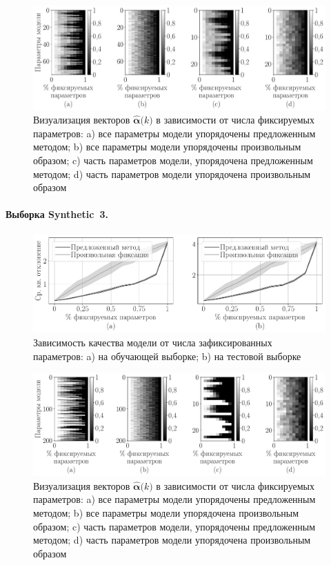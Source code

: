 \begin{figure}[h!t]\center
\includegraphics[width=1\textwidth]{results/order/boston_data_matshow}
\caption{Визуализация векторов $\hat{\bm{\alpha}}\bigr(k\bigr)$ в зависимости от числа фиксируемых параметров: a) все параметры модели упорядочены предложенным методом; b) все параметры модели упорядочены произвольным образом; c) часть параметров модели, упорядочена предложенным методом; d) часть параметров модели упорядочена произвольным образом}
\label{fg:ex:bost:2}
\end{figure}

\paragraph{Выборка Synthetic~3.}
\begin{figure}[h!t]\center
\includegraphics[width=1\textwidth]{results/order/generate_data_linear_loss}
\caption{Зависимость качества модели от числа зафиксированных параметров: a) на обучающей выборке; b) на тестовой выборке}
\label{fg:ex:syn1:1}
\end{figure}

\begin{figure}[h!t]\center
\includegraphics[width=1\textwidth]{results/order/generate_data_linear_matshow}
\caption{Визуализация векторов $\hat{\bm{\alpha}}\bigr(k\bigr)$ в зависимости от числа фиксируемых параметров: a) все параметры модели упорядочены предложенным методом; b) все параметры модели упорядочена произвольным образом; c) часть параметров модели, упорядочены предложенным методом; d) часть параметров модели упорядочена произвольным образом}
\label{fg:ex:syn1:2}
\end{figure}

